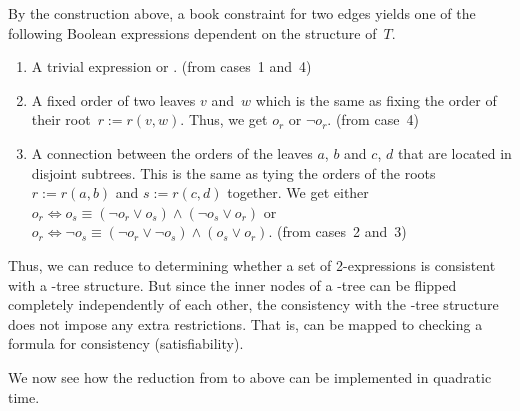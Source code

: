 By the construction above, a book constraint for two edges yields one of the following Boolean expressions dependent on the structure of~$T$.

\begin{enumerate}
  \item A trivial expression  or . (from cases~1 and~4)
  \item A fixed order of two leaves $v$ and~$w$ which is the same
  as fixing the order of their root~$r := r(v, w)$. Thus, we get
  $o_r$ or $\lnot o_r$. (from case~4)
  \item A connection between the orders of the leaves $a$, $b$ and $c$, $d$
  that are located in disjoint subtrees. This is the same as tying the
  orders of the roots $r := r(a, b)$ and $s := r(c, d)$ together.
  We get either $o_r \Leftrightarrow o_s \equiv (\lnot o_r \lor o_s) \land (\lnot o_s \lor o_r)$
  or $o_r \Leftrightarrow \lnot o_s \equiv (\lnot o_r \lor \lnot o_s) \land (o_s \lor o_r)$. (from cases~2 and~3)
\end{enumerate}

Thus, we can reduce \probQTree to determining whether a set of 2-\CNF expressions
is consistent with a \Q-tree structure. But since the inner nodes of a \Q-tree can be flipped completely independently of each other, the consistency with the \Q-tree structure does not
impose any extra restrictions. That is, \probQTree can be mapped to checking
a \probTwoSat formula for consistency (satisfiability).



We now see how the reduction from \probQTree to \probTwoSat above can be 
implemented in qua\-dratic time.

